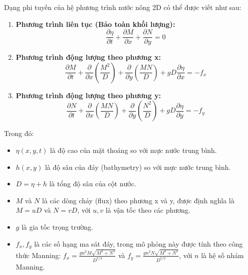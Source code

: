 \documentclass[12pt, a4paper]{article}
\begin{document}
Dạng phi tuyến của hệ phương trình nước nông 2D có thể được viết như sau:

\begin{enumerate}
    \item \textbf{Phương trình liên tục (Bảo toàn khối lượng):}
    \begin{equation}
        \frac{\partial \eta}{\partial t} + \frac{\partial M}{\partial x} + \frac{\partial N}{\partial y} = 0
        \label{eq:continuity}
    \end{equation}

    \item \textbf{Phương trình động lượng theo phương x:}
    \begin{equation}
        \frac{\partial M}{\partial t} + \frac{\partial}{\partial x}\left(\frac{M^2}{D}\right) + \frac{\partial}{\partial y}\left(\frac{MN}{D}\right) + gD\frac{\partial \eta}{\partial x} = -f_x
        \label{eq:momentum_x}
    \end{equation}

    \item \textbf{Phương trình động lượng theo phương y:}
    \begin{equation}
        \frac{\partial N}{\partial t} + \frac{\partial}{\partial x}\left(\frac{MN}{D}\right) + \frac{\partial}{\partial y}\left(\frac{N^2}{D}\right) + gD\frac{\partial \eta}{\partial y} = -f_y
        \label{eq:momentum_y}
    \end{equation}
\end{enumerate}

Trong đó:
\begin{itemize}
    \item $\eta(x, y, t)$ là độ cao của mặt thoáng so với mực nước trung bình.
    \item $h(x, y)$ là độ sâu của đáy (bathymetry) so với mực nước trung bình.
    \item $D = \eta + h$ là tổng độ sâu của cột nước.
    \item $M$ và $N$ là các dòng chảy (flux) theo phương x và y, được định nghĩa là $M = uD$ và $N = vD$, với $u, v$ là vận tốc theo các phương.
    \item $g$ là gia tốc trọng trường.
    \item $f_x, f_y$ là các số hạng ma sát đáy, trong mô phỏng này được tính theo công thức Manning: $f_x = \frac{gn^2 M \sqrt{M^2+N^2}}{D^{7/3}}$ và $f_y = \frac{gn^2 N \sqrt{M^2+N^2}}{D^{7/3}}$, với $n$ là hệ số nhám Manning.
\end{itemize}
\end{document}
